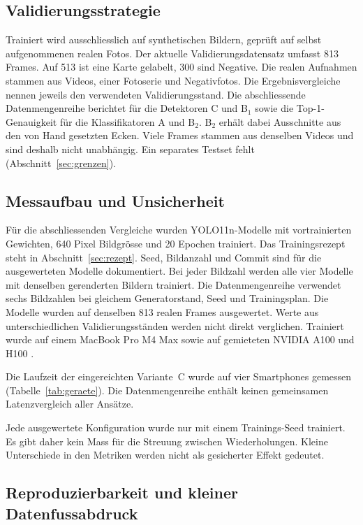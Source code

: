\subsection{Validierungsstrategie}\label{sec:validierung}

Trainiert wird ausschliesslich auf synthetischen Bildern, geprüft auf
selbst aufgenommenen realen Fotos. Der aktuelle Validierungsdatensatz
umfasst 813 Frames. Auf 513 ist eine Karte gelabelt, 300 sind Negative.
Die realen Aufnahmen stammen aus Videos, einer Fotoserie und
Negativfotos. Die Ergebnisvergleiche nennen jeweils den verwendeten
Validierungsstand. Die abschliessende Datenmengenreihe berichtet
 für die Detektoren C und B$_1$ sowie die Top-1-Genauigkeit
für die Klassifikatoren A und B$_2$. B$_2$ erhält dabei Ausschnitte
aus den von Hand gesetzten Ecken. Viele Frames stammen aus
denselben Videos und sind deshalb nicht unabhängig. Ein separates
Testset fehlt (Abschnitt~\ref{sec:grenzen}).

\subsection{Messaufbau und Unsicherheit}\label{sec:setup}

Für die abschliessenden Vergleiche wurden YOLO11n-Modelle mit
vortrainierten Gewichten, 640 Pixel Bildgrösse und 20 Epochen trainiert.
Das Trainingsrezept steht in Abschnitt~\ref{sec:rezept}. Seed,
Bildanzahl und Commit sind für die ausgewerteten Modelle dokumentiert.
Bei jeder Bildzahl werden alle vier Modelle mit denselben gerenderten
Bildern trainiert. Die Datenmengenreihe verwendet sechs Bildzahlen bei
gleichem Generatorstand, Seed und Trainingsplan. Die Modelle wurden
auf denselben 813 realen Frames ausgewertet. Werte aus unterschiedlichen
Validierungsständen werden nicht direkt verglichen. Trainiert wurde
auf einem MacBook Pro M4 Max sowie auf gemieteten NVIDIA A100 und H100 \cite{runpod2025gpu}.

Die Laufzeit der eingereichten Variante~C wurde auf vier Smartphones
gemessen (Tabelle~\ref{tab:geraete}). Die Datenmengenreihe enthält keinen gemeinsamen
Latenzvergleich aller Ansätze.

Jede ausgewertete Konfiguration wurde nur mit einem Trainings-Seed
trainiert. Es gibt daher kein Mass für die Streuung zwischen
Wiederholungen. Kleine Unterschiede in den Metriken werden nicht
als gesicherter Effekt gedeutet.

\subsection{Reproduzierbarkeit und kleiner Datenfussabdruck}\label{sec:repro}

